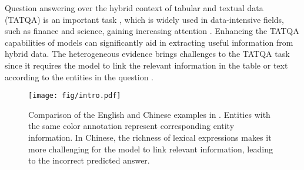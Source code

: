 Question answering over the hybrid context of tabular and textual data (TATQA) is an important task \cite{chen-etal-2020-hybridqa}, which is widely used in data-intensive fields, such as finance and science, gaining increasing attention \cite{chen-etal-2021-finqa,auer2023sciqa}. 
Enhancing the TATQA capabilities of models can significantly aid in extracting useful information from hybrid data.
The heterogeneous evidence brings challenges to the TATQA task since it requires the model to link the relevant information in the table or text according to the entities in the question \cite{feng-etal-2022-multi-hop,lei-etal-2022-Graph-based-Encoder,wang2022hybridqa-survey}.

\begin{figure}[t]
    \centering
    \texttt{[image: fig/intro.pdf]}
    \vspace{-0.5em}
    \caption{
    Comparison of the English and Chinese examples in \ourdataset.
    Entities with the same color annotation represent corresponding entity information.
    In Chinese, the richness of lexical expressions makes it more challenging for the model to link relevant information, leading to the incorrect predicted answer.
    }
    \label{fig:intro}
\end{figure}

